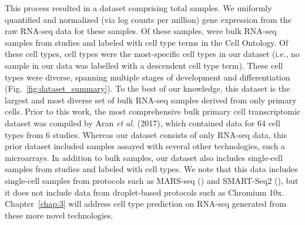 This process resulted in a dataset comprising \TotalExperiments{} total samples.  We uniformly quantified and normalized (via log counts per million) gene expression from the raw RNA-seq data for these samples.  Of these samples, \ExperimentsInBulkDataset{} were bulk RNA-seq samples from \StudiesInBulkDataset{} studies and labeled with \CellTypesInBulkDataset{} cell type terms in the Cell Ontology. Of these cell types, \MostSpecificBulkCellTypes{} cell types were the most-specific cell types in our dataset (i.e., no sample in our data was labelled with a descendent cell type term). These cell types were diverse, spanning multiple stages of development and differentiation (Fig.~\ref{fig:dataset_summary}). To the best of our knowledge, this dataset is the largest and most diverse set of bulk RNA-seq samples derived from only primary cells.  Prior to this work, the most comprehensive bulk primary cell transcriptomic dataset was compiled by Aran \textit{et al.} (2017), which contained data for 64 cell types from 6 studies.  Whereas our dataset consists of only RNA-seq data, this prior dataset included samples assayed with several other technologies, such a microarrays.  In addition to bulk samples, our dataset also includes \ExperimentsInSingleCellDataset{}  single-cell samples from \StudiesInSingleCellDataset{} studies and labeled with \CellTypesInSingleCellDataset{} cell types. We note that this data includes single-cell samples from protocols such as MARS-seq (\citealp{Jaitin2014}) and SMART-Seq2 (\citealp{Picelli2013}), but it does not include data from droplet-based protocols such as Chromium 10x. Chapter~\ref{chap:3} will address cell type prediction on RNA-seq generated from these more novel technologies.


